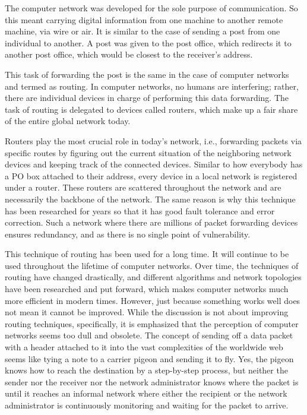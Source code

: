    The computer network was developed for the sole purpose of communication. So this meant carrying digital information from one machine to another remote machine, via wire or air. It is similar to the case of sending a post from one individual to another. A post was given to the post office, which redirects it to another post office, which would be closest to the receiver's address.
    
    This task of forwarding the post is the same in the case of computer networks and termed as routing. In computer networks, no humans are interfering; rather, there are individual devices in charge of performing this data forwarding. The task of routing is delegated to devices called routers, which make up a fair share of the entire global network today.
    
    Routers play the most crucial role in today's network, i.e., forwarding packets via specific routes by figuring out the current situation of the neighboring network devices and keeping track of the connected devices. Similar to how everybody has a PO box attached to their address, every device in a local network is registered under a router. These routers are scattered throughout the network and are necessarily the backbone of the network. The same reason is why this technique has been researched for years so that it has good fault tolerance and error correction. Such a network where there are millions of packet forwarding devices ensures redundancy, and as there is no single point of vulnerability.
    \vspace{2mm}
    
    This technique of routing has been used for a long time. It will continue to be used throughout the lifetime of computer networks. Over time, the techniques of routing have changed drastically, and different algorithms and network topologies \cite{topograph1996} have been researched and put forward, which makes computer networks much more efficient in modern times. However, just because something works well does not mean it cannot be improved. While the discussion is not about improving routing techniques, specifically, it is emphasized that the perception of computer networks seems too dull and obsolete. The concept of sending off a data packet with a header attached to it into the vast complexities of the worldwide web seems like tying a note to a carrier pigeon and sending it to fly. Yes, the pigeon knows how to reach the destination by a step-by-step process, but neither the sender nor the receiver nor the network administrator knows where the packet is until it reaches an informal network where either the recipient or the network administrator is continuously monitoring and waiting for the packet to arrive.
    
